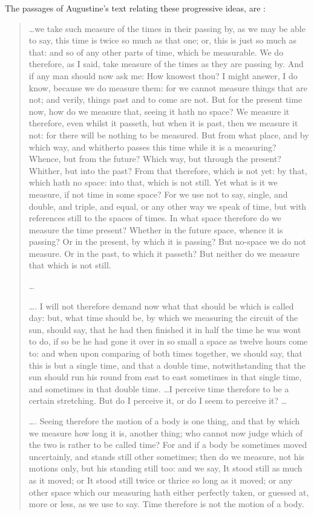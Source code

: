 The passages of Augustine's text relating these progressive ideas, are \cite{Augustine1912}:
\begin{quotation}
\ldots we take such measure of the times in their passing by, as we may be able to say, this time is twice so much as that one; or, this is just so much as that: and so of any other parts of time, which be measurable. We do therefore, as I said, take measure of the times as they are passing by. And if any man should now ask me: How knowest thou? I might answer, I do know, because we do measure them: for we cannot measure things that are not; and verily, things past and to come are not. But for the present time now, how do we measure that, seeing it hath no space? We measure it therefore, even whilst it passeth, but when it is past, then we measure it not: for there will be nothing to be measured. But from what place, and by which way, and whitherto passes this time while it is a measuring? Whence, but from the future? Which way, but through the present? Whither, but into the past? From that therefore, which is not yet: by that, which hath no space: into that, which is not still. Yet what is it we measure, if not time in some space? For we use not to say, single, and double, and triple, and equal, or any other way we speak of time, but with references still to the spaces of times. In what space therefore do we measure the time present? Whether in the future space, whence it is passing? Or in the present, by which it is passing? But no-space we do not measure. Or in the past, to which it passeth? But neither do we measure that which is not still.

\ldots

\ldots. I will not therefore demand now what that should be which is called day: but, what time should be, by which we measuring the circuit of the sun, should say, that he had then finished it in half the time he was wont to do, if so be he had gone it over in so small a space as twelve hours come to: and when upon comparing of both times together, we should say, that this is but a single time, and that a double time, notwithstanding that the sun should run his round from east to east sometimes in that single time, and sometimes in that double time. \ldots I perceive time therefore to be a certain stretching. But do I perceive it, or do I seem to perceive it? \ldots

\ldots. Seeing therefore the motion of a body is one thing, and that by which we measure how long it is, another thing; who cannot now judge which of the two is rather to be called time? For and if a body be sometimes moved uncertainly, and stands still other sometimes; then do we measure, not his motions only, but his standing still too: and we say, It stood still as much as it moved; or It stood still twice or thrice so long as it moved; or any other space which our measuring hath either perfectly taken, or guessed at, more or less, as we use to say. Time therefore is not the motion of a body.


\end{quotation}
